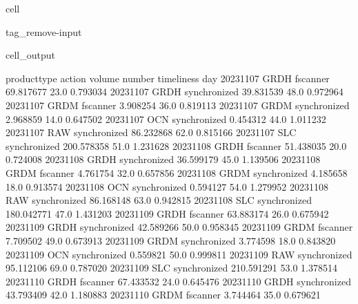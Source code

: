 \documentclass[letterpaper,10pt,english]{jupyterBook}
\begin{document}
\begin{sphinxuseclass}{cell}
\begin{sphinxuseclass}{tag_remove-input}\begin{sphinxVerbatimOutput}

\begin{sphinxuseclass}{cell_output}
\begin{sphinxVerbatim}[commandchars=\\\{\}]
           product\PYGZus{}type        action      volume  number  timeliness
day                                                                  
2023\PYGZhy{}11\PYGZhy{}07         GRDH      fscanner   69.817677    23.0    0.793034
2023\PYGZhy{}11\PYGZhy{}07         GRDH  synchronized   39.831539    48.0    0.972964
2023\PYGZhy{}11\PYGZhy{}07         GRDM      fscanner    3.908254    36.0    0.819113
2023\PYGZhy{}11\PYGZhy{}07         GRDM  synchronized    2.968859    14.0    0.647502
2023\PYGZhy{}11\PYGZhy{}07          OCN  synchronized    0.454312    44.0    1.011232
2023\PYGZhy{}11\PYGZhy{}07          RAW  synchronized   86.232868    62.0    0.815166
2023\PYGZhy{}11\PYGZhy{}07          SLC  synchronized  200.578358    51.0    1.231628
2023\PYGZhy{}11\PYGZhy{}08         GRDH      fscanner   51.438035    20.0    0.724008
2023\PYGZhy{}11\PYGZhy{}08         GRDH  synchronized   36.599179    45.0    1.139506
2023\PYGZhy{}11\PYGZhy{}08         GRDM      fscanner    4.761754    32.0    0.657856
2023\PYGZhy{}11\PYGZhy{}08         GRDM  synchronized    4.185658    18.0    0.913574
2023\PYGZhy{}11\PYGZhy{}08          OCN  synchronized    0.594127    54.0    1.279952
2023\PYGZhy{}11\PYGZhy{}08          RAW  synchronized   86.168148    63.0    0.942815
2023\PYGZhy{}11\PYGZhy{}08          SLC  synchronized  180.042771    47.0    1.431203
2023\PYGZhy{}11\PYGZhy{}09         GRDH      fscanner   63.883174    26.0    0.675942
2023\PYGZhy{}11\PYGZhy{}09         GRDH  synchronized   42.589266    50.0    0.958345
2023\PYGZhy{}11\PYGZhy{}09         GRDM      fscanner    7.709502    49.0    0.673913
2023\PYGZhy{}11\PYGZhy{}09         GRDM  synchronized    3.774598    18.0    0.843820
2023\PYGZhy{}11\PYGZhy{}09          OCN  synchronized    0.559821    50.0    0.999811
2023\PYGZhy{}11\PYGZhy{}09          RAW  synchronized   95.112106    69.0    0.787020
2023\PYGZhy{}11\PYGZhy{}09          SLC  synchronized  210.591291    53.0    1.378514
2023\PYGZhy{}11\PYGZhy{}10         GRDH      fscanner   67.433532    24.0    0.645476
2023\PYGZhy{}11\PYGZhy{}10         GRDH  synchronized   43.793409    42.0    1.180883
2023\PYGZhy{}11\PYGZhy{}10         GRDM      fscanner    3.744464    35.0    0.679621

\end{sphinxVerbatim}
\end{sphinxuseclass}
\end{sphinxVerbatimOutput}
\end{sphinxuseclass}
\end{sphinxuseclass}
\end{document}
